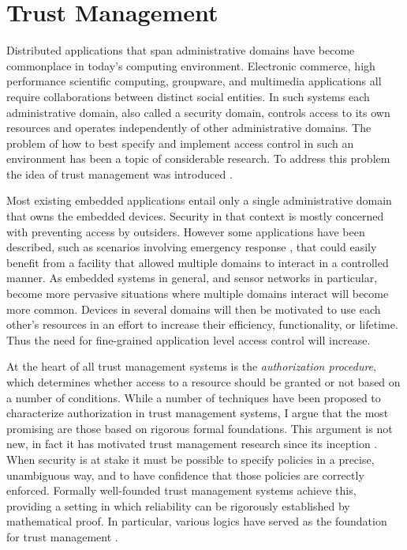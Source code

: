 
\chapter{Trust Management}
\label{chapter-trust-management}

Distributed applications that span administrative domains have become commonplace in today's
computing environment. Electronic commerce, high performance scientific computing, groupware,
and multimedia applications all require collaborations between distinct social entities. In such
systems each administrative domain, also called a security domain, controls access to its own
resources and operates independently of other administrative domains. The problem of how to best
specify and implement access control in such an environment has been a topic of considerable
research. To address this problem the idea of trust management was introduced \cite{Blaze:DTM}.

Most existing embedded applications entail only a single administrative domain that owns the
embedded devices. Security in that context is mostly concerned with preventing access by
outsiders. However some applications have been described, such as scenarios involving emergency
response \cite{1038146}, that could easily benefit from a facility that allowed multiple domains
to interact in a controlled manner. As embedded systems in general, and sensor networks in
particular, become more pervasive situations where multiple domains interact will become more
common. Devices in several domains will then be motivated to use each other's resources in an
effort to increase their efficiency, functionality, or lifetime. Thus the need for fine-grained
application level access control will increase.

At the heart of all trust management systems is the \emph{authorization procedure}, which
determines whether access to a resource should be granted or not based on a number of
conditions. While a number of techniques have been proposed to characterize authorization in
trust management systems, I argue that the most promising are those based on rigorous formal
foundations. This argument is not new, in fact it has motivated trust management research since
its inception \cite{woo93authorizations}. When security is at stake it must be possible to
specify policies in a precise, unambiguous way, and to have confidence that those policies are
correctly enforced. Formally well-founded trust management systems achieve this, providing a
setting in which reliability can be rigorously established by mathematical proof. In particular,
various logics have served as the foundation for trust management
\cite{Abadi:LAC,Bertino:LFRAACM}.


